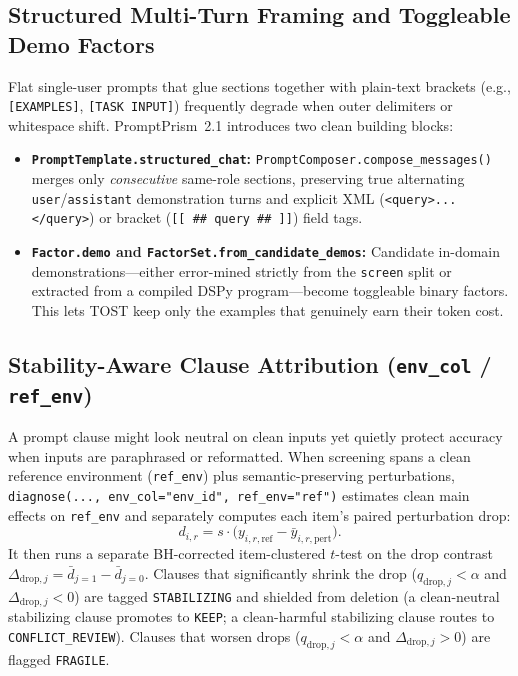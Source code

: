 \documentclass[11pt,a4paper]{article}
\newcommand{\method}{PromptPrism}
\begin{document}
\subsection{Structured Multi-Turn Framing and Toggleable Demo Factors}
Flat single-user prompts that glue sections together with plain-text brackets (e.g., \texttt{[EXAMPLES]}, \texttt{[TASK INPUT]}) frequently degrade when outer delimiters or whitespace shift. \method{}~2.1 introduces two clean building blocks:
\begin{itemize}[leftmargin=*,nosep]
    \item \textbf{\texttt{PromptTemplate.\allowbreak structured\_chat}:} \texttt{PromptComposer.\allowbreak compose\_messages()} merges only \emph{consecutive} same-role sections, preserving true alternating \texttt{user}/\texttt{assistant} demonstration turns and explicit XML (\texttt{<query>...</query>}) or bracket (\texttt{[[ \#\# query \#\# ]]}) field tags.
    \item \textbf{\texttt{Factor.demo} and \texttt{FactorSet.\allowbreak from\_\allowbreak candidate\_demos}:} Candidate in-domain demonstrations---either error-mined strictly from the \texttt{screen} split or extracted from a compiled DSPy program---become toggleable binary factors. This lets TOST keep only the examples that genuinely earn their token cost.
\end{itemize}

\subsection{Stability-Aware Clause Attribution (\texttt{env\_col} / \texttt{ref\_env})}
A prompt clause might look neutral on clean inputs yet quietly protect accuracy when inputs are paraphrased or reformatted. When screening spans a clean reference environment (\texttt{ref\_env}) plus semantic-preserving perturbations, \texttt{diagnose(..., env\_col="env\_id", ref\_env="ref")} estimates clean main effects on \texttt{ref\_env} and separately computes each item's paired perturbation drop:
\[
    d_{i,r} = s \cdot \bigl(y_{i,r,\mathrm{ref}} - \bar{y}_{i,r,\mathrm{pert}}\bigr).
\]
It then runs a separate BH-corrected item-clustered $t$-test on the drop contrast $\Delta_{\mathrm{drop},j} = \bar{d}_{j=1} - \bar{d}_{j=0}$. Clauses that significantly shrink the drop ($q_{\mathrm{drop},j} < \alpha$ and $\Delta_{\mathrm{drop},j} < 0$) are tagged \texttt{STABILIZING} and shielded from deletion (a clean-neutral stabilizing clause promotes to \texttt{KEEP}; a clean-harmful stabilizing clause routes to \texttt{CONFLICT\_REVIEW}). Clauses that worsen drops ($q_{\mathrm{drop},j} < \alpha$ and $\Delta_{\mathrm{drop},j} > 0$) are flagged \texttt{FRAGILE}.
\end{document}
